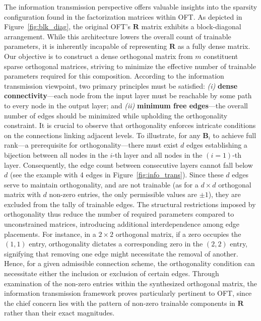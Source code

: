 The information transmission perspective offers valuable insights into the sparsity configuration found in the factorization matrices within OFT. As depicted in Figure~\ref{fig:blk_diag}, the original OFT’s $\bm{R}$ matrix exhibits a block-diagonal arrangement. While this architecture lowers the overall count of trainable parameters, it is inherently incapable of representing $\bm{R}$ as a fully dense matrix. Our objective is to construct a dense orthogonal matrix from $m$ constituent sparse orthogonal matrices, striving to minimize the effective number of trainable parameters required for this composition. According to the information transmission viewpoint, two primary principles must be satisfied: \emph{(i)} \textbf{dense connectivity}—each node from the input layer must be reachable by some path to every node in the output layer; and \emph{(ii)} \textbf{minimum free edges}—the overall number of edges should be minimized while upholding the orthogonality constraint. It is crucial to observe that orthogonality enforces intricate conditions on the connections linking adjacent levels. To illustrate, for any $\bm{B}_i$ to achieve full rank—a prerequisite for orthogonality—there must exist $d$ edges establishing a bijection between all nodes in the $i$-th layer and all nodes in the $(i=1)$-th layer. Consequently, the edge count between consecutive layers cannot fall below $d$ (see the example with 4 edges in Figure~\ref{fig:info_trans}). Since these $d$ edges serve to maintain orthogonality, and are not trainable (as for a $d\times d$ orthogonal matrix with $d$ non-zero entries, the only permissible values are $\pm 1$), they are excluded from the tally of trainable edges. The structural restrictions imposed by orthogonality thus reduce the number of required parameters compared to unconstrained matrices, introducing additional interdependence among edge placements. For instance, in a $2\times 2$ orthogonal matrix, if a zero occupies the $(1,1)$ entry, orthogonality dictates a corresponding zero in the $(2,2)$ entry, signifying that removing one edge might necessitate the removal of another. Hence, for a given admissible connection scheme, the orthogonality condition can necessitate either the inclusion or exclusion of certain edges. Through examination of the non-zero entries within the synthesized orthogonal matrix, the information transmission framework proves particularly pertinent to OFT, since the chief concern lies with the pattern of non-zero trainable components in $\bm{R}$ rather than their exact magnitudes.

